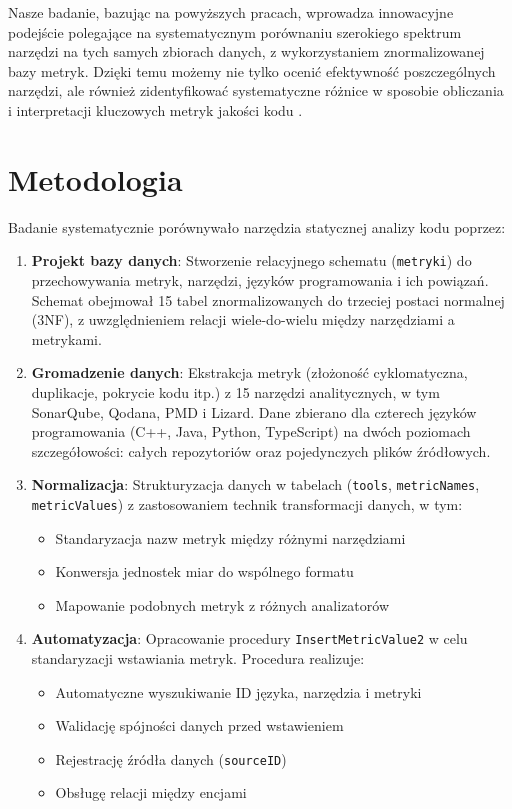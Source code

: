 \documentclass[a4paper,12pt]{article}
\begin{document}
Nasze badanie, bazując na powyższych pracach, wprowadza innowacyjne podejście polegające na systematycznym porównaniu szerokiego spektrum narzędzi na tych samych zbiorach danych, z wykorzystaniem znormalizowanej bazy metryk. Dzięki temu możemy nie tylko ocenić efektywność poszczególnych narzędzi, ale również zidentyfikować systematyczne różnice w sposobie obliczania i interpretacji kluczowych metryk jakości kodu \cite{fenton2014software}.

\section{Metodologia}
Badanie systematycznie porównywało narzędzia statycznej analizy kodu poprzez:

\begin{enumerate}
\item \textbf{Projekt bazy danych}: Stworzenie relacyjnego schematu (\texttt{metryki}) do przechowywania metryk, narzędzi, języków programowania i ich powiązań. Schemat obejmował 15 tabel znormalizowanych do trzeciej postaci normalnej (3NF), z uwzględnieniem relacji wiele-do-wielu między narzędziami a metrykami.

\item \textbf{Gromadzenie danych}: Ekstrakcja metryk (złożoność cyklomatyczna, duplikacje, pokrycie kodu itp.) z 15 narzędzi analitycznych, w tym SonarQube, Qodana, PMD i Lizard. Dane zbierano dla czterech języków programowania (C++, Java, Python, TypeScript) na dwóch poziomach szczegółowości: całych repozytoriów oraz pojedynczych plików źródłowych.

\item \textbf{Normalizacja}: Strukturyzacja danych w tabelach (\texttt{tools}, \texttt{metricNames}, \texttt{metricValues}) z zastosowaniem technik transformacji danych, w tym:
\begin{itemize}
\item Standaryzacja nazw metryk między różnymi narzędziami
\item Konwersja jednostek miar do wspólnego formatu
\item Mapowanie podobnych metryk z różnych analizatorów
\end{itemize}

\item \textbf{Automatyzacja}: Opracowanie procedury \texttt{InsertMetricValue2} w celu standaryzacji wstawiania metryk. Procedura realizuje:
\begin{itemize}
\item Automatyczne wyszukiwanie ID języka, narzędzia i metryki
\item Walidację spójności danych przed wstawieniem
\item Rejestrację źródła danych (\texttt{sourceID})
\item Obsługę relacji między encjami
\end{itemize}
\end{enumerate}
\end{document}
